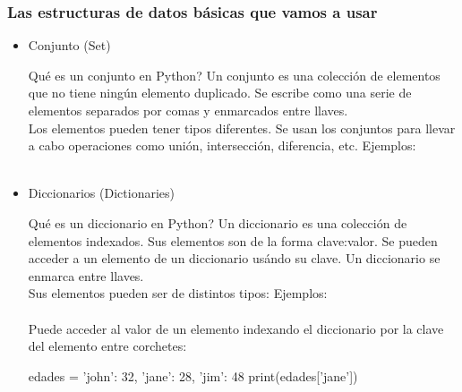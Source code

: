 \documentclass[handout,9pt]{beamer}
\begin{document}
\begin{frame}[fragile]
  \frametitle{Las estructuras de datos básicas que vamos a usar}
  \begin{itemize}
  \item Conjunto (Set) \\ \pause
    {\scriptsize
      \begin{minipage}{0.9\textwidth}
        \begin{block}{Qué es un conjunto en Python?}
          Un conjunto es una colección de elementos que no tiene
          ningún elemento duplicado. Se escribe como una serie de
          elementos separados por comas y enmarcados entre llaves.\\ 
          Los elementos pueden tener tipos diferentes. Se usan los
          conjuntos para llevar a cabo operaciones como unión,
          intersección, diferencia, etc. Ejemplos:\\ 
           \\
        \end{block}
      \end{minipage}}\pause
  \item Diccionarios (Dictionaries) \\ \pause
    {\scriptsize
      \begin{minipage}{0.9\textwidth}
        \begin{block}{Qué es un diccionario en Python?}
          Un diccionario es una colección de elementos indexados. Sus
          elementos son de la forma clave:valor. Se pueden acceder a
          un elemento de un diccionario usándo su clave. Un diccionario se enmarca entre llaves.\\
          Sus elementos pueden ser de distintos tipos:
          Ejemplos:\\ \\
          Puede acceder al valor de un elemento indexando el
          diccionario por la clave del elemento entre corchetes:
          \begin{pyconsole}
edades = {'john': 32,  'jane': 28, 'jim': 48}
print(edades['jane'])
\end{pyconsole}
        \end{block}
      \end{minipage}}
  \end{itemize}
\end{frame}
\end{document}
